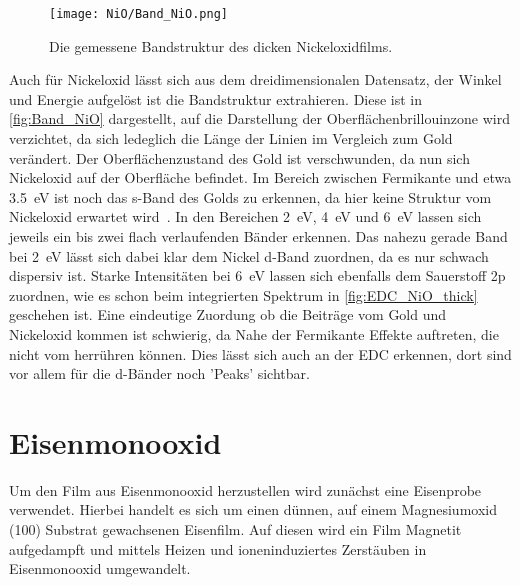         \begin{figure}
            \centering
            \texttt{[image: NiO/Band\_NiO.png]}
            \caption{Die gemessene Bandstruktur des dicken Nickeloxidfilms.}
            \label{fig:Band_NiO}
        \end{figure}
        Auch für Nickeloxid lässt sich aus dem dreidimensionalen Datensatz, der Winkel und Energie aufgelöst ist die Bandstruktur extrahieren.
        Diese ist in \autoref{fig:Band_NiO} dargestellt, auf die Darstellung der Oberflächenbrillouinzone wird verzichtet, da sich ledeglich die Länge der Linien im Vergleich zum Gold verändert.
        Der Oberflächenzustand des Gold ist verschwunden, da nun sich Nickeloxid auf der Oberfläche befindet.
        Im Bereich zwischen Fermikante und etwa \SI{3.5}{\electronvolt} ist noch das s-Band des Golds zu erkennen, da hier keine Struktur vom Nickeloxid erwartet wird~\cite{NiO_12}.
        In den Bereichen \SI{2}{\electronvolt}, \SI{4}{\electronvolt} und \SI{6}{\electronvolt} lassen sich jeweils ein bis zwei flach verlaufenden Bänder erkennen.
        Das nahezu gerade Band bei \SI{2}{\electronvolt} lässt sich dabei klar dem Nickel d-Band zuordnen, da es nur schwach dispersiv ist.
        Starke Intensitäten bei \SI{6}{\electronvolt} lassen sich ebenfalls dem Sauerstoff 2p zuordnen, wie es schon beim integrierten Spektrum in \autoref{fig:EDC_NiO_thick} geschehen ist.
        Eine eindeutige Zuordung ob die Beiträge vom Gold und Nickeloxid kommen ist schwierig, da Nahe der Fermikante Effekte auftreten, die nicht vom  herrühren können.
        Dies lässt sich auch an der EDC erkennen, dort sind vor allem für die d-Bänder noch 'Peaks' sichtbar.
        
    \FloatBarrier
    \section{Eisenmonooxid} \label{sec:Prep_FeO}
        Um den Film aus Eisenmonooxid herzustellen wird zunächst eine Eisenprobe verwendet.
        Hierbei handelt es sich um einen dünnen, auf einem Magnesiumoxid (100) Substrat gewachsenen Eisenfilm.
        Auf diesen wird ein Film Magnetit aufgedampft und mittels Heizen und ioneninduziertes Zerstäuben in Eisenmonooxid umgewandelt.


